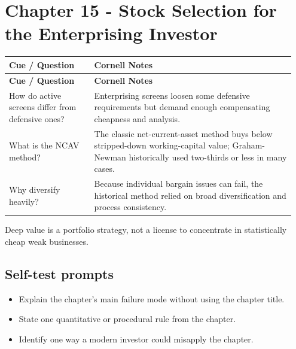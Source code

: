 \documentclass[11pt]{article}
\begin{document}
\section{Chapter 15 - Stock Selection for the Enterprising Investor}
\begin{longtable}{@{}>{\raggedright\arraybackslash}p{0.29\linewidth}>{\raggedright\arraybackslash}p{0.66\linewidth}@{}}\toprule\textbf{Cue / Question} & \textbf{Cornell Notes}\\\midrule\endfirsthead\toprule\textbf{Cue / Question} & \textbf{Cornell Notes}\\\midrule\endhead
How do active screens differ from defensive ones? & Enterprising screens loosen some defensive requirements but demand enough compensating cheapness and analysis. \\
What is the NCAV method? & The classic net-current-asset method buys below stripped-down working-capital value; Graham-Newman historically used two-thirds or less in many cases. \\
Why diversify heavily? & Because individual bargain issues can fail, the historical method relied on broad diversification and process consistency. \\
\bottomrule\end{longtable}
\begin{principlebox}Deep value is a portfolio strategy, not a license to concentrate in statistically cheap weak businesses.\end{principlebox}
\subsection*{Self-test prompts}\begin{itemize}\item Explain the chapter's main failure mode without using the chapter title.\item State one quantitative or procedural rule from the chapter.\item Identify one way a modern investor could misapply the chapter.\end{itemize}
\end{document}
